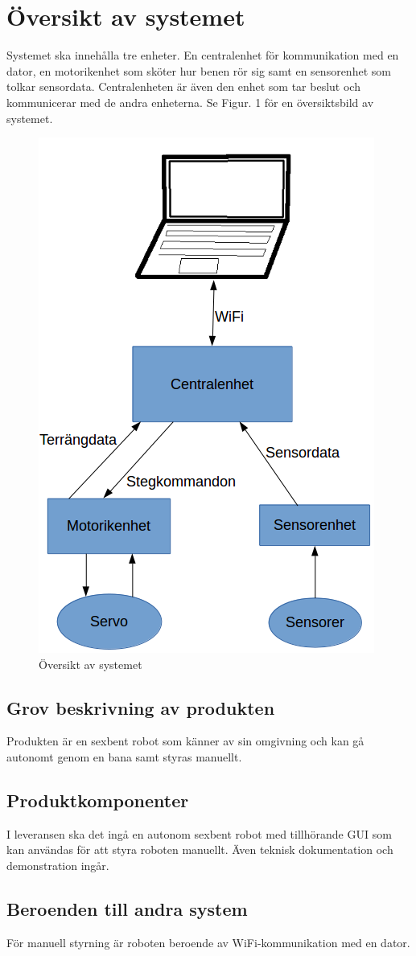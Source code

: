 \documentclass[a4paper,titlepage,12pt]{article}
\begin{document}
	\section{Översikt av systemet}
	Systemet ska innehålla tre enheter. En centralenhet för kommunikation med en dator, en motorikenhet
	som sköter hur benen rör sig samt en sensorenhet som tolkar sensordata. Centralenheten är även den enhet som
	tar beslut och kommunicerar med de andra enheterna. Se Figur. 1 för en översiktsbild av systemet.
	\begin{figure}[h]
		\centering
		\includegraphics[width=0.5\linewidth]{../images/overview.png}
		\caption{Översikt av systemet}
		\label{fig:../images/overview}
	\end{figure}

	\subsection{Grov beskrivning av produkten}
	Produkten är en sexbent robot som känner av sin omgivning och kan gå autonomt
	genom en bana samt styras manuellt.
	\subsection{Produktkomponenter}
	I leveransen ska det ingå en autonom sexbent robot med tillhörande GUI som kan användas för att 
	styra roboten manuellt. Även teknisk dokumentation och demonstration ingår. 
	\subsection{Beroenden  till andra system}
    För manuell styrning är roboten beroende av WiFi-kommunikation med en dator.
\end{document}
